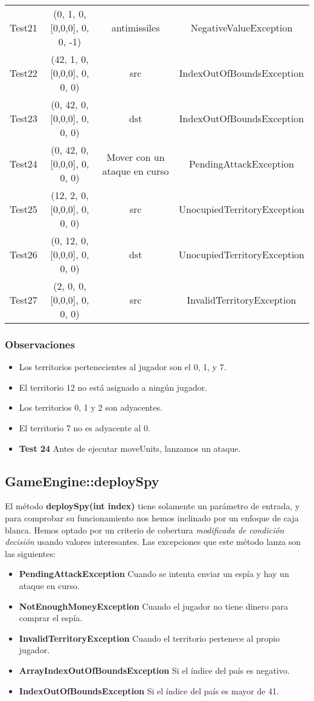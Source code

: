 {\begin{longtable}[c]{lccc}
Test21 & (0, 1, 0, [0,0,0], 0, 0, -1)  & antimissiles & NegativeValueException \\
Test22 & (42, 1, 0, [0,0,0], 0, 0, 0)& src & IndexOutOfBoundsException \\
Test23 & (0, 42, 0, [0,0,0], 0, 0, 0)& dst & IndexOutOfBoundsException \\
Test24 & (0, 42, 0, [0,0,0], 0, 0, 0)& Mover con un ataque en curso & PendingAttackException \\
Test25 & (12, 2, 0, [0,0,0], 0, 0, 0)& src & UnocupiedTerritoryException \\
Test26 & (0, 12, 0, [0,0,0], 0, 0, 0)& dst & UnocupiedTerritoryException \\
Test27 & (2, 0, 0, [0,0,0], 0, 0, 0)& src & InvalidTerritoryException \\
\hline
\end{longtable}
\subsubsection{Observaciones}

\begin{itemize}
 \item  Los territorios pertenecientes al jugador son el 0, 1, y 7.
\item  El territorio 12 no está asignado a ningún jugador.
\item  Los territorios 0, 1 y 2 son adyacentes.
\item  El territorio 7 no es adyacente al 0.
\item \textbf{Test 24} Antes de ejecutar moveUnits, lanzamos un ataque.

\end{itemize}

}
\subsection{GameEngine::deploySpy}

El método \textbf{deploySpy(int index)} tiene solamente un parámetro de entrada, y para comprobar su funcionamiento nos hemos inclinado por un enfoque de caja blanca. Hemos optado por un criterio de 
cobertura \textit{modificada de condición decisión } usando valores interesantes.
Las excepciones que este método lanza son las siguientes:
\begin{itemize}
\item \textbf{PendingAttackException} Cuando se intenta enviar un espía y hay un ataque en curso.
\item \textbf{NotEnoughMoneyException} Cuando el jugador no tiene dinero para comprar el espía.
\item \textbf{InvalidTerritoryException} Cuando el territorio pertenece al propio jugador.
\item \textbf{ArrayIndexOutOfBoundsException} Si el índice del país es negativo.
\item \textbf{IndexOutOfBoundsException} Si el índice del país es mayor de 41.
\end{itemize}


